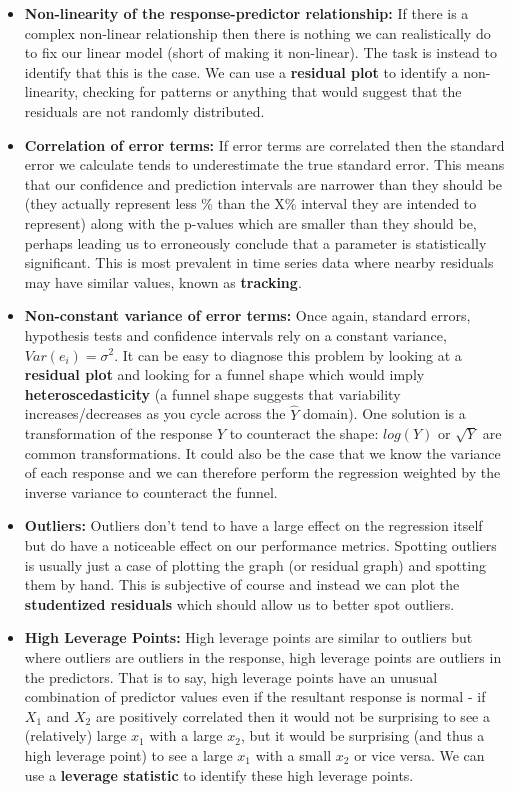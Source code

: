 \begin{itemize}
    \item \textbf{Non-linearity of the response-predictor relationship:} If there is a complex non-linear relationship then there is nothing we can realistically do to fix our linear model (short of making it non-linear). The task is instead to identify that this is the case. We can use a \textbf{residual plot} to identify a non-linearity, checking for patterns or anything that would suggest that the residuals are not randomly distributed.
    \item \textbf{Correlation of error terms:} If error terms are correlated then the standard error we calculate tends to underestimate the true standard error. This means that our confidence and prediction intervals are narrower than they should be (they actually represent less \% than the X\% interval they are intended to represent) along with the p-values which are smaller than they should be, perhaps leading us to erroneously conclude that a parameter is statistically significant. This is most prevalent in time series data where nearby residuals may have similar values, known as \textbf{tracking}.
    \item \textbf{Non-constant variance of error terms:} Once again, standard errors, hypothesis tests and confidence intervals rely on a constant variance, $Var(e_{i}) = \sigma^{2}$. It can be easy to diagnose this problem by looking at a \textbf{residual plot} and looking for a funnel shape which would imply \textbf{heteroscedasticity} (a funnel shape suggests that variability increases/decreases as you cycle across the $\hat{Y}$ domain). One solution is a transformation of the response $Y$ to counteract the shape: $log(Y)$ or $\sqrt{Y}$ are common transformations. It could also be the case that we know the variance of each response and we can therefore perform the regression weighted by the inverse variance to counteract the funnel.
    \item \textbf{Outliers:} Outliers don't tend to have a large effect on the regression itself but do have a noticeable effect on our performance metrics. Spotting outliers is usually just a case of plotting the graph (or residual graph) and spotting them by hand. This is subjective of course and instead we can plot the \textbf{studentized residuals} which should allow us to better spot outliers.
    \item \textbf{High Leverage Points:} High leverage points are similar to outliers but where outliers are outliers in the response, high leverage points are outliers in the predictors. That is to say, high leverage points have an unusual combination of predictor values even if the resultant response is normal - if $X_{1}$ and $X_{2}$ are positively correlated then it would not be surprising to see a (relatively) large $x_{1}$ with a large $x_{2}$, but it would be surprising (and thus a high leverage point) to see a large $x_{1}$ with a small $x_{2}$ or vice versa. We can use a \textbf{leverage statistic} to identify these high leverage points.

\end{itemize}
